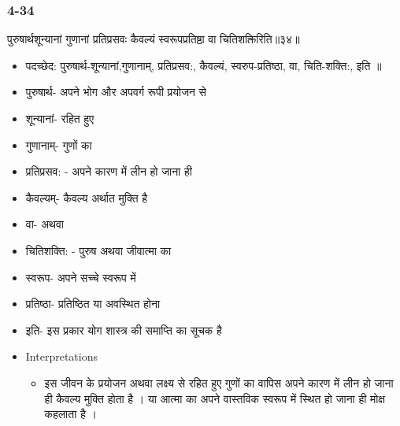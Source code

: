 \begin{frame}[fragile]\frametitle{4-34}
\begin{sanskrit}
पुरुषार्थशून्यानां गुणानां प्रतिप्रसवः कैवल्यं स्वरूपप्रतिष्ठा वा चितिशक्तिरिति॥३४॥
\end{sanskrit}

	\begin{itemize}
	\item पदच्छेद:  पुरुषार्थ-शून्यानां,गुणानाम्, प्रतिप्रसव:, कैवल्यं, स्वरुप-प्रतिष्ठा, वा, चिति-शक्ति:, इति ‌॥
	\item पुरुषार्थ- अपने भोग और अपवर्ग रूपी प्रयोजन से
	\item शून्यानां- रहित हुए
	\item गुणानाम्- गुणों का
	\item प्रतिप्रसव: - अपने कारण में लीन हो जाना ही
	\item कैवल्यम्- कैवल्य अर्थात मुक्ति है
	\item वा- अथवा
	\item चितिशक्ति: - पुरुष अथवा जीवात्मा का
	\item स्वरूप- अपने सच्चे स्वरूप में
	\item प्रतिष्ठा- प्रतिष्ठित या अवस्थित होना
	\item इति- इस प्रकार योग शास्त्र की समाप्ति का सूचक है	
	\item Interpretations
		\begin{itemize}	
		\item इस जीवन के प्रयोजन अथवा लक्ष्य से रहित हुए गुणों का वापिस अपने कारण में लीन हो जाना ही कैवल्य मुक्ति होता है । या आत्मा का अपने वास्तविक स्वरूप में स्थित हो जाना ही मोक्ष कहलाता है ।

		\end{itemize}
	\end{itemize}
\end{frame}

